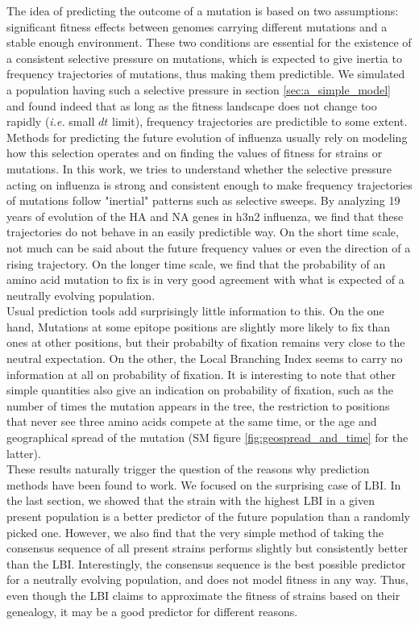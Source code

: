 \documentclass{article}
\begin{document}
The idea of predicting the outcome of a mutation is based on two assumptions: significant fitness effects between genomes carrying different mutations and a stable enough environment. These two conditions are essential for the existence of a consistent selective pressure on mutations, which is expected to give inertia to frequency trajectories of mutations, thus making them predictible. We simulated a population having such a selective pressure in  section \ref{sec:a_simple_model} and found indeed that as long as the fitness landscape does not change too rapidly (\emph{i.e.} small $dt$ limit), frequency trajectories are predictible to some extent. \\
Methods for predicting the future evolution of influenza usually rely on modeling how this selection operates and on finding the values of fitness for strains or mutations. In this work, we tries to understand whether the selective pressure acting on influenza is strong and consistent enough to make frequency trajectories of mutations follow "inertial" patterns such as selective sweeps. By analyzing 19 years of evolution of the HA and NA genes in h3n2 influenza, we find that these trajectories do not behave in an easily predictible way. On the short time scale, not much can be said about the future frequency values or even the direction of a rising trajectory. On the longer time scale, we find that the probability of an amino acid mutation to fix is in very good agreement with what is expected of a neutrally evolving population. \\
Usual prediction tools add surprisingly little information to this. On the one hand, Mutations at some epitope positions are slightly more likely to fix than ones at other positions, but their probabilty of fixation remains very close to the neutral expectation. On the other, the Local Branching Index seems to carry no information at all on probability of fixation. It is interesting to note that other simple quantities also give an indication on probability of fixation, such as the number of times the mutation appears in the tree, the restriction to positions that never see three amino acids compete at the same time, or the age and geographical spread of the mutation (SM figure \ref{fig:geospread_and_time} for the latter). \\
These results naturally trigger the question of the reasons why prediction methods have been found to work. We focused on the surprising case of LBI. In the last section, we showed that the strain with the highest LBI in a given present population is a better predictor of the future population than a randomly picked one. However, we also find that the very simple method of taking the consensus sequence of all present strains performs slightly but consistently better than the LBI. Interestingly, the consensus sequence is the best possible predictor for a neutrally evolving population, and does not model fitness in any way. Thus, even though the LBI claims to approximate the fitness of strains based on their genealogy, it may be a good predictor for different reasons. \\
\end{document}
